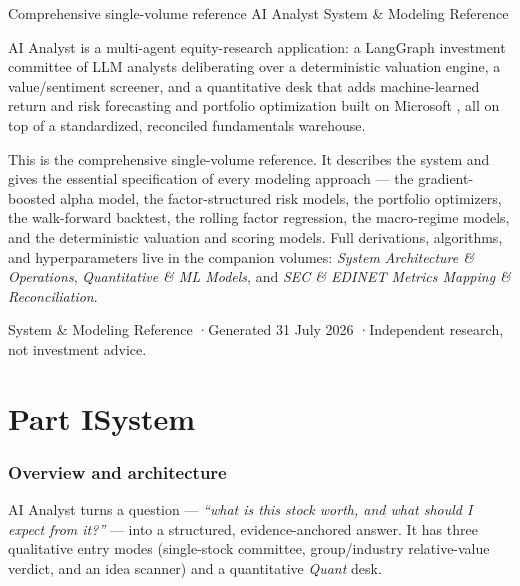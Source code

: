 \documentclass[11pt]{article}
\begin{document}
\mzqatitlepage
  {Comprehensive single-volume reference}
  {AI Analyst}
  {System \& Modeling Reference}
  {AI Analyst is a multi-agent equity-research application: a LangGraph investment
   committee of LLM analysts deliberating over a deterministic valuation engine, a
   value/sentiment screener, and a quantitative desk that adds machine-learned
   return and risk forecasting and portfolio optimization built on Microsoft
   , all on top of a standardized, reconciled fundamentals warehouse.

   \vspace{8pt}
   This is the comprehensive single-volume reference. It describes the system and
   gives the essential specification of every modeling approach --- the
   gradient-boosted alpha model, the factor-structured risk models, the portfolio
   optimizers, the walk-forward backtest, the rolling factor regression, the
   macro-regime models, and the deterministic valuation and scoring models. Full
   derivations, algorithms, and hyperparameters live in the companion volumes:
   \emph{System Architecture \& Operations}, \emph{Quantitative \& ML Models}, and
   \emph{SEC \& EDINET Metrics Mapping \& Reconciliation}.}
  {System \& Modeling Reference \quad·\quad Generated 31 July 2026 \quad·\quad Independent research, not investment advice.}

\mzqatoc
\clearpage

\part*{Part I\quad System}

\section{Overview and architecture}
AI Analyst turns a question --- \emph{``what is this stock worth, and what should I
expect from it?''} --- into a structured, evidence-anchored answer. It has three
qualitative entry modes (single-stock committee, group/industry relative-value
verdict, and an idea scanner) and a quantitative \emph{Quant} desk.
\end{document}
